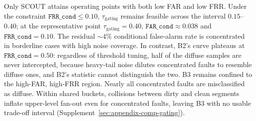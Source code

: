 \label{sec:eval-comp-far-frr}
Only SCOUT attains operating points with both low FAR and low FRR. Under the constraint $\texttt{FRR\_cond}\le 0.10$, $\tau_{\text{gating}}$ remains feasible across the interval $0.15$--$0.40$; at the representative point $\tau_{\text{gating}}{=}0.40$, $\texttt{FAR\_cond}\approx 0.038$ and $\texttt{FRR\_cond}{=}0.10$. The residual ${\sim}4\%$ conditional false-alarm rate is concentrated in borderline cases with high noise coverage. In contrast, B2's curve plateaus at $\texttt{FRR\_cond}{=}0.50$: regardless of threshold tuning, half of the diffuse samples are never intercepted, because heavy-tail noise dilutes concentrated faults to resemble diffuse ones, and B2's statistic cannot distinguish the two. B3 remains confined to the high-FAR, high-FRR region. Nearly all concentrated faults are misclassified as diffuse. Within shared buckets, collisions between dirty and clean segments inflate upper-level fan-out even for concentrated faults, leaving B3 with no usable trade-off interval (Supplement~\ref{sec:appendix-comp-gating}).
